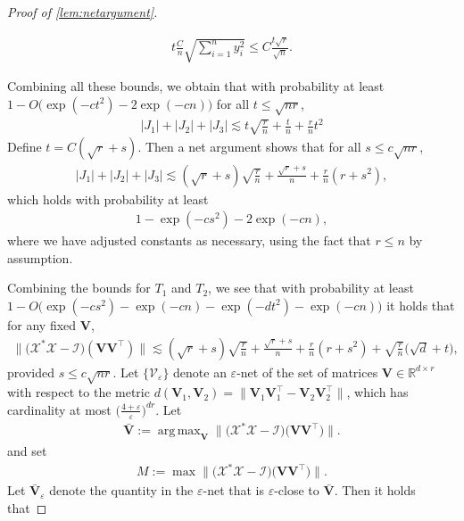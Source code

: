 \documentclass[10pt]{article}
\DeclareMathOperator*{\argmax}{arg\,max}
\newcommand{\eps}{\ensuremath{\varepsilon}}
\newcommand{\s}{^*}
\renewcommand{\t}{^{\top}}
\theoremstyle{definition}
\begin{document}
\begin{proof}[Proof of \cref{lem:netargument}]
\begin{itemize}
\begin{itemize}
\begin{align*}
    t \frac{C}{n} \sqrt{\sum_{i=1}^{n} y_i^2} \leq C \frac{t \sqrt{r}}{\sqrt{n}}.
\end{align*}
\end{itemize}
Combining all these bounds, we obtain that with probability at least $1 - O\bigg(   \exp( - c t^2) - 2 \exp( - c n) \bigg)$ for all $t \leq \sqrt{nr}$,
\begin{align*}
    |J_1 | + |J_2| + |J_3| \lesssim t \sqrt{\frac{r}{n}} + \frac{t}{n} +  \frac{r}{n} t^2 
\end{align*}
Define $t = C ( \sqrt{r} + s)$.  Then a net argument shows that for all $s \leq c \sqrt{nr}$,
\begin{align}
    |J_1| + |J_2| + |J_3| \lesssim ( \sqrt{r} + s ) \sqrt{\frac{r}{n}} + \frac{\sqrt{r}  + s }{n} + \frac{r}{n} ( r + s^2),
\end{align}
which holds with probability at least
\begin{align*}
    1 - \exp ( - c s ^2) - 2 \exp( - c n),
\end{align*}
where we have adjusted constants as necessary, using the fact that $r \leq n$ by assumption.    
\end{itemize}
Combining the bounds for $T_1$ and $T_2$, we see that with probability at least $1 - O\bigg( \exp( -c s^2) - \exp( - c n) - \exp( - d t^2) - \exp( - c n) \bigg)$ it holds that for any fixed $\bm{V}$,
\begin{align*}
    \bigg\| \bigg( \mathcal{X}\s \mathcal{X} - \mathcal{I} \bigg) ( \bm{VV}\t ) \bigg\| \lesssim  ( \sqrt{r} + s ) \sqrt{\frac{r}{n}} + \frac{\sqrt{r}  + s }{n} + \frac{r}{n} ( r + s^2) + \sqrt{\frac{r}{n}} \bigg( \sqrt{d} + t \bigg),
\end{align*}
provided $s \leq c \sqrt{nr}$. Let $\{\mathcal{V}_{\eps} \}$ denote an $\eps$-net of the set of matrices $\bm{V} \in \mathbb{R}^{d \times r}$ with respect to the metric $d(\bm{V}_1, \bm{V}_2) = \| \bm{V}_1 \bm{V}_1\t - \bm{V}_2 \bm{V}_2\t \|$, which has cardinality at most $\big(\frac{4+\eps}{\eps} \big)^{dr}$.  Let
\begin{align}
    \bm{\bar V} := \argmax_{\bm{V}} \bigg\| \bigg( \mathcal{X}\s \mathcal{X} - \mathcal{I} \bigg)  \big( \bm{VV}\t \big) \bigg\| .
\end{align}
and set
\begin{align}
    M := \max \bigg\| \bigg( \mathcal{X}\s \mathcal{X} - \mathcal{I} \bigg)  \big( \bm{VV}\t \big) \bigg\| .
\end{align}
Let $\bm{\bar V}_{\eps}$ denote the quantity in the $\eps$-net that is $\eps$-close to $\bm{\bar V}$.  Then it holds that 

\end{proof}
\end{document}

